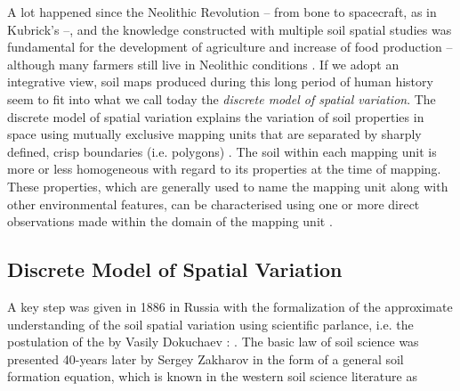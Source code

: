 
A lot happened since the Neolithic Revolution \cite{BrevikEtAl2010} -- from bone to spacecraft, as in 
Kubrick's \footKubrick --, and the knowledge constructed with multiple soil spatial studies was fundamental 
for the development of agriculture and increase of food production -- although many farmers still live in 
Neolithic conditions \cite{MazoyerEtAl2008}. If we adopt an integrative view, soil maps produced during this 
long period of human history seem to fit into what we call today the \emph{discrete model of spatial 
variation}. The discrete model of spatial variation explains the variation of soil properties in space 
using mutually exclusive mapping units that are separated by sharply defined, crisp boundaries (i.e. polygons) 
\cite{Heuvelink1996, Legros2006}. The soil\footsoil{} within each mapping unit is more or less homogeneous 
with regard to its properties at the time of mapping. These properties, which are generally used to name the 
mapping unit along with other environmental features, can be characterised using one or more direct 
observations made within the domain of the mapping unit \cite{WebsterEtAl1990, Rossiter2000, 
Legros2006}.

\subsection{Discrete Model of Spatial Variation}

A key step was given in 1886 in Russia with the formalization of the approximate understanding of the soil 
spatial variation using scientific parlance, i.e. the postulation of the  by 
Vasily Dokuchaev \cite{Florinsky2012}: . The basic law of soil science was presented 40-years later by Sergey Zakharov in the form of a 
general soil formation equation, which is known in the western soil science literature as \cite{Jenny1941, 
Florinsky2012}

